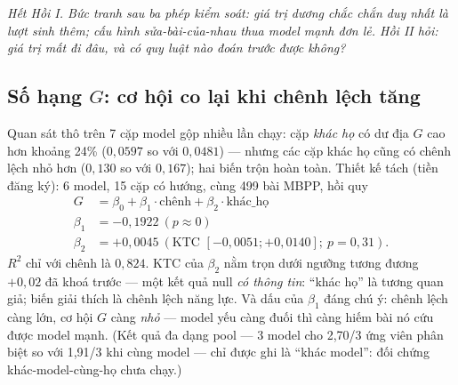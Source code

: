 \documentclass[11pt,a4paper]{article}
\begin{document}
\emph{Hết Hồi I. Bức tranh sau ba phép kiểm soát: giá trị dương chắc chắn duy nhất là lượt sinh
thêm; cấu hình sửa-bài-của-nhau thua model mạnh đơn lẻ. Hồi II hỏi: giá trị mất đi đâu, và có
quy luật nào đoán trước được không?}

\subsection{Số hạng $G$: cơ hội co lại khi chênh lệch tăng}\label{sec:termG}

Quan sát thô trên 7 cặp model gộp nhiều lần chạy: cặp \emph{khác họ} có dư địa $G$ cao hơn
khoảng 24\% ($0{,}0597$ so với $0{,}0481$) --- nhưng các cặp khác họ cũng có chênh lệch nhỏ hơn
($0{,}130$ so với $0{,}167$); hai biến trộn hoàn toàn. Thiết kế tách (tiền đăng ký): 6 model,
15 cặp có hướng, cùng 499 bài MBPP, hồi quy
\begin{align*}
G &= \beta_0 + \beta_1\cdot\text{chênh} + \beta_2\cdot\text{khác\_họ}\\
\beta_1 &= -0{,}1922\ (p \approx 0)\\
\beta_2 &= +0{,}0045\ (\text{KTC } [-0{,}0051;+0{,}0140];\ p = 0{,}31).
\end{align*}
$R^2$ chỉ với chênh là $0{,}824$. KTC của $\beta_2$ nằm trọn dưới ngưỡng tương đương $+0{,}02$
đã khoá trước --- một kết quả null \emph{có thông tin}: ``khác họ'' là tương quan giả; biến
giải thích là chênh lệch năng lực. Và dấu của $\beta_1$ đáng chú ý: chênh lệch càng lớn, cơ
hội $G$ càng \emph{nhỏ} --- model yếu càng đuối thì càng hiếm bài nó cứu được model mạnh. (Kết
quả đa dạng pool --- 3 model cho 2,70/3 ứng viên phân biệt so với 1,91/3 khi cùng model --- chỉ
được ghi là ``khác model'': đối chứng khác-model-cùng-họ chưa chạy.)
\end{document}
